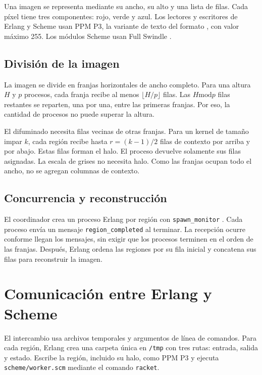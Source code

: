 \documentclass[11pt]{article}
\begin{document}
Una imagen se representa mediante su ancho, su alto y una lista de filas.
Cada píxel tiene tres componentes: rojo, verde y azul. Los lectores y
escritores de Erlang y Scheme usan PPM P3, la variante de texto del formato
\cite{netpbm-ppm}, con valor máximo 255. Los módulos Scheme usan Full Swindle
\cite{racket-swindle}.

\subsection{División de la imagen}

La imagen se divide en franjas horizontales de ancho completo. Para una altura
$H$ y $p$ procesos, cada franja recibe al menos $\lfloor H/p \rfloor$ filas.
Las $H \mathbin{\mathrm{mod}} p$ filas restantes se reparten, una por una, entre las primeras
franjas. Por eso, la cantidad de procesos no puede superar la altura.

El difuminado necesita filas vecinas de otras franjas. Para un kernel de tamaño
impar $k$, cada región recibe hasta $r=(k-1)/2$ filas de contexto por arriba y
por abajo. Estas filas forman el halo. El proceso devuelve solamente sus filas
asignadas. La escala de grises no necesita halo. Como las franjas ocupan todo
el ancho, no se agregan columnas de contexto.

\subsection{Concurrencia y reconstrucción}

El coordinador crea un proceso Erlang por región con \texttt{spawn\_monitor}
\cite{erlang-processes}.
Cada proceso envía un mensaje \texttt{region\_completed} al terminar. La
recepción ocurre conforme llegan los mensajes, sin exigir que los procesos
terminen en el orden de las franjas. Después, Erlang ordena las regiones por
su fila inicial y concatena sus filas para reconstruir la imagen.

\section{Comunicación entre Erlang y Scheme}

El intercambio usa archivos temporales y argumentos de línea de comandos.
Para cada región, Erlang crea una carpeta única en \texttt{/tmp} con tres
rutas: entrada, salida y estado. Escribe la región, incluido su halo, como
PPM P3 y ejecuta \texttt{scheme/worker.scm} mediante el comando
\texttt{racket}.
\end{document}
